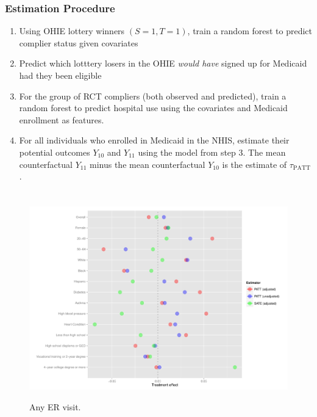 \documentclass{beamer}
\begin{document}
\begin{frame} 
\frametitle{Estimation Procedure}
\begin{enumerate}
\item Using OHIE lottery winners $(S=1, T=1)$, train a random forest \citep{breiman2001} to predict complier status given covariates
\item Predict which lotttery losers in the OHIE \textit{would have} signed up for Medicaid had they been eligible
\item For the group of RCT compliers (both observed and predicted), train a random forest to predict hospital use using the covariates and Medicaid enrollment as features.
\item For all individuals who enrolled in Medicaid in the NHIS, estimate their potential outcomes $Y_{10}$ and $Y_{11}$ using the model from step 3.  The mean counterfactual $Y_{11}$ minus the mean counterfactual $Y_{10}$ is the estimate of $\tau_{\text{PATT}}$.
\end{enumerate}
\end{frame}



\section[Results]{}

\begin{frame}
\begin{figure}[htbp]
\begin{center}
       \caption{Any ER visit.}
   \includegraphics[scale=0.35]{../paper/any-visit-plot.pdf} 
   \label{het-plot-av}
   \end{center}
\end{figure}
\end{frame}
\end{document}
